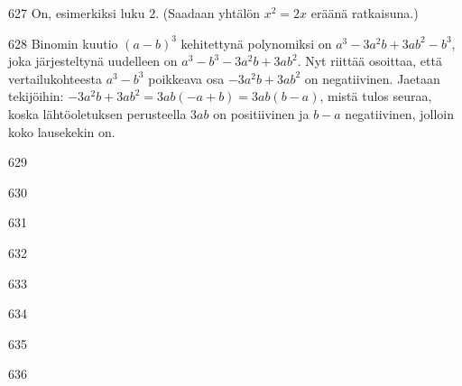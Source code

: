\begin{Vastaus}{627}
On, esimerkiksi luku $2$. (Saadaan yhtälön $x^2=2x$ eräänä ratkaisuna.)
	
\end{Vastaus}
\begin{Vastaus}{628}
	Binomin kuutio $(a-b)^3$ kehitettynä polynomiksi on $a^3-3a^2b+3ab^2-b^3$, joka järjesteltynä uudelleen on $a^3-b^3-3a^2b+3ab^2$. Nyt riittää osoittaa, että vertailukohteesta $a^3-b^3$ poikkeava osa $-3a^2b+3ab^2$ on negatiivinen. Jaetaan tekijöihin: $-3a^2b+3ab^2=3ab(-a+b)=3ab(b-a)$, mistä tulos seuraa, koska lähtöoletuksen perusteella $3ab$ on positiivinen ja $b-a$ negatiivinen, jolloin koko lausekekin on.
	
\end{Vastaus}
\begin{Vastaus}{629}
    
\end{Vastaus}
\begin{Vastaus}{630}
    
\end{Vastaus}
\begin{Vastaus}{631}
    
\end{Vastaus}
\begin{Vastaus}{632}
    
\end{Vastaus}
\begin{Vastaus}{633}
    
\end{Vastaus}
\begin{Vastaus}{634}
	
\end{Vastaus}
\begin{Vastaus}{635}
    
\end{Vastaus}
\begin{Vastaus}{636}
	
\end{Vastaus}
